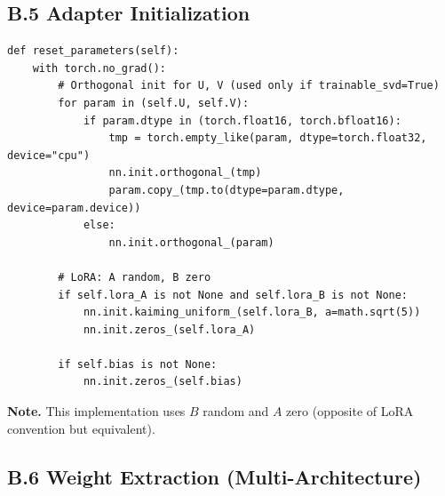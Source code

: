 \subsection{B.5 Adapter Initialization}

\begin{lstlisting}
def reset_parameters(self):
    with torch.no_grad():
        # Orthogonal init for U, V (used only if trainable_svd=True)
        for param in (self.U, self.V):
            if param.dtype in (torch.float16, torch.bfloat16):
                tmp = torch.empty_like(param, dtype=torch.float32, device="cpu")
                nn.init.orthogonal_(tmp)
                param.copy_(tmp.to(dtype=param.dtype, device=param.device))
            else:
                nn.init.orthogonal_(param)
        
        # LoRA: A random, B zero
        if self.lora_A is not None and self.lora_B is not None:
            nn.init.kaiming_uniform_(self.lora_B, a=math.sqrt(5))
            nn.init.zeros_(self.lora_A)
        
        if self.bias is not None:
            nn.init.zeros_(self.bias)
\end{lstlisting}

\textbf{Note.} This implementation uses $B$ random and $A$ zero (opposite of LoRA 
convention but equivalent).

\subsection{B.6 Weight Extraction (Multi-Architecture)}

